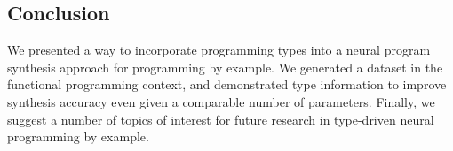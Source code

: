 \documentclass{article} %
\begin{document}

\subsection{Conclusion}

We presented a way to incorporate programming types into a neural program synthesis approach for programming by example.
We generated a dataset in the functional programming context,
and demonstrated type information to improve synthesis accuracy even given a comparable number of parameters.
Finally, we suggest a number of topics of interest for future research in type-driven neural programming by example.


% 
% 




\end{document}
